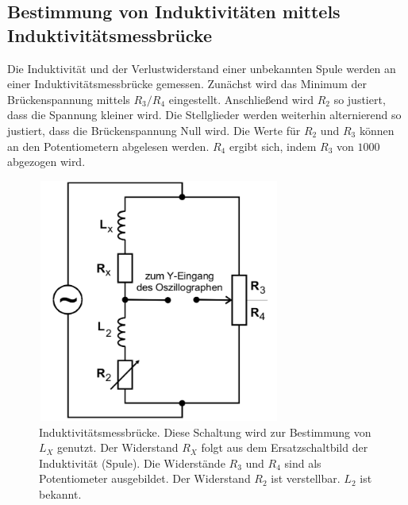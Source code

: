 \subsection{Bestimmung von Induktivitäten mittels Induktivitätsmessbrücke}
Die Induktivität und der Verlustwiderstand einer unbekannten Spule werden 
an einer Induktivitätsmessbrücke gemessen.
\newline
Zunächst wird das Minimum der Brückenspannung mittels $R_3/R_4$ eingestellt.
Anschließend wird $R_2$ so justiert, dass die Spannung kleiner wird.
Die Stellglieder werden weiterhin alternierend so justiert, dass die
Brückenspannung Null wird. Die Werte für $R_2$ und $R_3$ können an den
Potentiometern abgelesen werden. $R_4$ ergibt sich, indem $R_3$ von 
$\num{1000}$ abgezogen wird.
\begin{figure}
    \centering
    \includegraphics[width=8cm, height=8cm]{build/induktivitaet.png}
    \caption{Induktivitätsmessbrücke. Diese Schaltung wird zur Bestimmung
    von $L_X$ genutzt. Der Widerstand $R_X$ folgt aus dem
    Ersatzschaltbild der Induktivität (Spule). Die Widerstände $R_3$ und $R_4$
    sind als Potentiometer ausgebildet. Der Widerstand $R_2$ ist
    verstellbar. $L_2$ ist bekannt.}
    \label{induktivitaet}
\end{figure}

